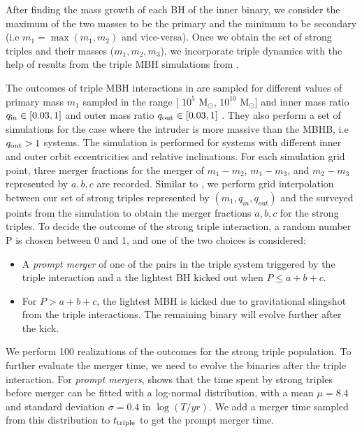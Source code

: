 \documentclass[11pt, letterpaper]{article}
\newcommand{\msun}{M$_{\odot}$}
\begin{document}
After finding the mass growth of each BH of the inner binary, we consider the maximum of the two masses to be the primary and the minimum to be secondary (i.e $m_1 = \max (m_1,m_2)$ and vice-versa). Once we obtain the set of strong triples and their masses ($m_1,m_2,m_3$), we incorporate triple dynamics with the help of results from the triple MBH simulations from \citet{bonetti_post-newtonian_2018-1}. 



The outcomes of triple MBH interactions in \citet{bonetti_post-newtonian_2018-1} are sampled for different values of primary mass $m_1$ sampled in the range [ $10^5$ \msun{}, $10^{10}$ \msun{}] and inner mass ratio $q_{\rm in} \in [0.03,1]$ and outer mass ratio $q_{\rm out} \in [0.03,1]$ . They also perform a set of simulations for the case where the intruder is more massive than the MBHB, i.e $q_{\rm out} > 1$ systems. The simulation is performed for systems with different inner and outer orbit eccentricities and relative inclinations. For each simulation grid point, three merger fractions for the merger of $m_1-m_2$, $m_1-m_3$, and $m_2-m_3$ represented by $a,b,c$ are recorded. Similar to \citet{bonetti_post-newtonian_2018}, we perform grid interpolation between our set of strong triples represented by $(m_1, q_{in}, q_{out})$ and the surveyed points from the simulation to obtain the merger fractions $a,b,c$  for the strong triples. To decide the outcome of the strong triple interaction, a random number P is chosen between 0 and 1, and one of the two choices is considered:

\begin{itemize}
    \item A \emph{prompt merger} of one of the pairs in the triple system triggered by the triple interaction and a the lightest BH kicked out when $P \leq a+b+c$. 

    \item For $P > a+b+c$, the lightest MBH is kicked due to gravitational slingshot from the triple interactions. The remaining binary will evolve further after the kick.
\end{itemize}

We perform 100 realizations of the outcomes for the strong triple population. To further evaluate the merger time, we need to evolve the binaries after the triple interaction. For \emph{prompt mergers}, \citet{bonetti_post-newtonian_2018-1} shows that the time spent by strong triples before merger can be fitted with a log-normal distribution, with a mean $\mu = 8.4$ and standard deviation $\sigma = 0.4$ in $\log(T/yr)$. We add a merger time sampled from this distribution to $t_{\rm triple}$ to get the prompt merger time.
\end{document}

